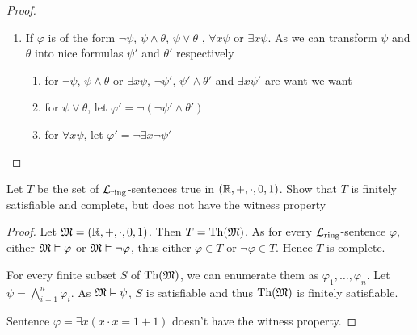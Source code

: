 \documentclass[11pt]{article}
\begin{document}
\begin{proof}
\begin{enumerate}
\item If \(\varphi\) is of the form \(\neg\psi\), \(\psi\wedge\theta\), \(\psi\vee\theta\) , \(\forall x\psi\) or \(\exists x\psi\). As we can transform \(\psi\) and \(\theta\) into nice
formulas \(\psi'\) and \(\theta'\) respectively
\begin{enumerate}
\item for \(\neg\psi\), \(\psi\wedge\theta\) or \(\exists x\psi\), \(\neg\psi'\), \(\psi'\wedge\theta'\) and \(\exists x\psi'\) are want we want

\item for \(\psi\vee\theta\), let \(\varphi'=\neg(\neg\psi'\wedge\theta')\)

\item for \(\forall x\psi\), let \(\varphi'=\neg\exists x\neg\psi'\)
\end{enumerate}
\end{enumerate}
\end{proof}

\begin{exercise}
Let \(T\) be the set of \(\mathcal{L}_{\text{ring}}\)-sentences true in \((\mathbb{R},+,\cdot,0,1)\). Show that \(T\) is
finitely satisfiable and complete, but does not have the witness property
\end{exercise}

\begin{proof}
Let \(\mathfrak{M}=(\mathbb{R},+,\cdot,0,1)\). Then \(T=\operatorname{Th}(\mathfrak{M})\). As for every \(\mathcal{L}_{\text{ring}}\)-sentence \(\varphi\),
either \(\mathfrak{M}\vDash\varphi\) or \(\mathfrak{M}\vDash\neg\varphi\), thus either \(\varphi\in T\) or \(\neg\varphi\in T\). Hence \(T\) is complete.

For every finite subset \(S\) of \(\operatorname{Th}(\mathfrak{M})\), we can enumerate them as \(\varphi_1,\dots,\varphi_n\). Let \(\psi=\bigwedge_{i=1}^n\varphi_i\).
As \(\mathfrak{M}\vDash\psi\), \(S\) is satisfiable and thus \(\operatorname{Th}(\mathfrak{M})\) is finitely satisfiable.

Sentence \(\varphi=\exists x(x\cdot x=1+1)\) doesn't have the witness property.
\end{proof}
\end{document}
